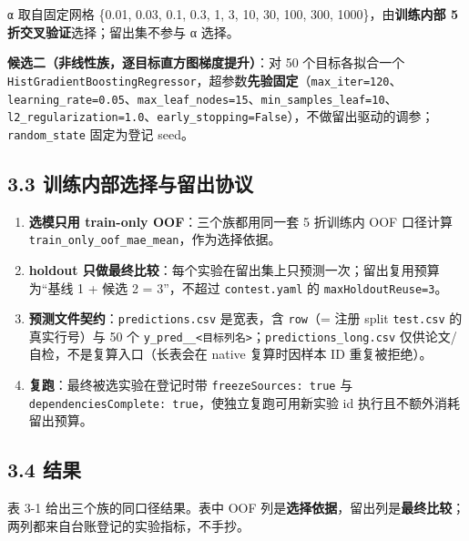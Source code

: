 \documentclass[
  11pt,
]{ctexart}
\providecommand{\tightlist}{%
  \setlength{\itemsep}{0pt}\setlength{\parskip}{0pt}}
\begin{document}
\texttt{α} 取自固定网格 \{0.01, 0.03, 0.1, 0.3, 1, 3, 10, 30, 100, 300,
1000\}，由\textbf{训练内部 5 折交叉验证}选择；留出集不参与 α 选择。

\textbf{候选二（非线性族，逐目标直方图梯度提升）}：对 50
个目标各拟合一个
\texttt{HistGradientBoostingRegressor}，超参数\textbf{先验固定}（\texttt{max\_iter=120}、\texttt{learning\_\allowbreak{}rate=0.\allowbreak{}05}、\texttt{max\_\allowbreak{}leaf\_\allowbreak{}nodes=15}、\texttt{min\_\allowbreak{}samples\_\allowbreak{}leaf=10}、\texttt{l2\_\allowbreak{}regularization=1.\allowbreak{}0}、\texttt{early\_\allowbreak{}stopping=False}），不做留出驱动的调参；\texttt{random\_state}
固定为登记 seed。

\subsection{3.3
训练内部选择与留出协议}\label{ux8badux7ec3ux5185ux90e8ux9009ux62e9ux4e0eux7559ux51faux534fux8bae}

\begin{enumerate}
\def\labelenumi{\arabic{enumi}.}
\tightlist
\item
  \textbf{选模只用 train-only OOF}：三个族都用同一套 5 折训练内 OOF
  口径计算 \texttt{train\_\allowbreak{}only\_\allowbreak{}oof\_\allowbreak{}mae\_\allowbreak{}mean}，作为选择依据。
\item
  \textbf{holdout
  只做最终比较}：每个实验在留出集上只预测一次；留出复用预算为``基线 1 +
  候选 2 = 3''，不超过 \texttt{contest.yaml} 的
  \texttt{maxHoldoutReuse=3}。
\item
  \textbf{预测文件契约}：\texttt{predictions.\allowbreak{}csv} 是宽表，含
  \texttt{row}（= 注册 split \texttt{test.csv} 的真实行号）与 50 个
  \texttt{y\_pred\_\_\textless{}目标列名\textgreater{}}；\texttt{predictions\_\allowbreak{}long.\allowbreak{}csv}
  仅供论文/自检，不是复算入口（长表会在 native 复算时因样本 ID
  重复被拒绝）。
\item
  \textbf{复跑}：最终被选实验在登记时带 \texttt{freezeSources:\ true} 与
  \texttt{dependenciesComplete:\ true}，使独立复跑可用新实验 id
  执行且不额外消耗留出预算。
\end{enumerate}

\subsection{3.4 结果}\label{ux7ed3ux679c}

表 3-1 给出三个族的同口径结果。表中 OOF
列是\textbf{选择依据}，留出列是\textbf{最终比较}；两列都来自台账登记的实验指标，不手抄。
\end{document}
